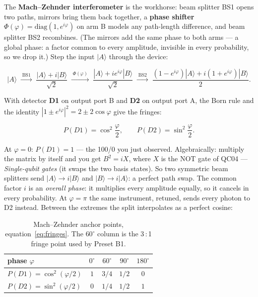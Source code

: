 \documentclass[a4paper,11pt]{article}
\providecommand{\ket}[1]{|#1\rangle}
\begin{document}
The \textbf{Mach--Zehnder interferometer} is the workhorse: beam splitter BS1 opens
two paths, mirrors bring them back together, a \textbf{phase shifter}
$\Phi(\varphi) = \mathrm{diag}(1, e^{i\varphi})$ on arm B models any path-length
difference, and beam splitter BS2 recombines. (The mirrors add the same phase to both
arms --- a global phase: a factor common to every amplitude, invisible in every
probability, so we drop it.) Step the input $\ket{A}$ through the device:

\begin{equation}
    \ket{A}
    \;\xrightarrow{\;\text{BS1}\;}\; \frac{\ket{A} + i\ket{B}}{\sqrt 2}
    \;\xrightarrow{\;\Phi(\varphi)\;}\; \frac{\ket{A} + i e^{i\varphi}\ket{B}}{\sqrt 2}
    \;\xrightarrow{\;\text{BS2}\;}\;
    \frac{(1 - e^{i\varphi})\ket{A} + i(1 + e^{i\varphi})\ket{B}}{2}.
    \label{eq:mzpipe}
\end{equation}

With detector \textbf{D1} on output port B and \textbf{D2} on output port A, the Born
rule and the identity $|1 \pm e^{i\varphi}|^2 = 2 \pm 2\cos\varphi$ give the fringes:

\begin{equation}
    P(D1) = \cos^2\!\frac{\varphi}{2}, \qquad P(D2) = \sin^2\!\frac{\varphi}{2}.
    \label{eq:fringes}
\end{equation}

At $\varphi = 0$: $P(D1) = 1$ --- the 100/0 you just observed. Algebraically: multiply
the matrix by itself and you get $B^2 = iX$, where $X$ is the NOT gate of QC04 ---
\textit{Single-qubit gates} (it swaps the two basis states). So two symmetric beam
splitters send $\ket{A} \to i\ket{B}$ and $\ket{B} \to i\ket{A}$: a perfect path swap.
The common factor $i$ is an \emph{overall phase}: it multiplies every amplitude
equally, so it cancels in every probability. At $\varphi = \pi$ the same instrument, retuned, sends
every photon to D2 instead. Between the extremes the split interpolates as a perfect
cosine:

\begin{table}[H]
\centering
\begin{tabular}{lcccc}
\toprule
phase $\varphi$ & $0^\circ$ & $60^\circ$ & $90^\circ$ & $180^\circ$ \\
\midrule
$P(D1) = \cos^2(\varphi/2)$ & $1$ & $3/4$ & $1/2$ & $0$ \\
$P(D2) = \sin^2(\varphi/2)$ & $0$ & $1/4$ & $1/2$ & $1$ \\
\bottomrule
\end{tabular}
\caption{Mach--Zehnder anchor points, equation~\eqref{eq:fringes}. The
$60^\circ$ column is the 3\,:\,1 fringe point used by Preset B1.}
\label{tab:mz}
\end{table}
\end{document}
